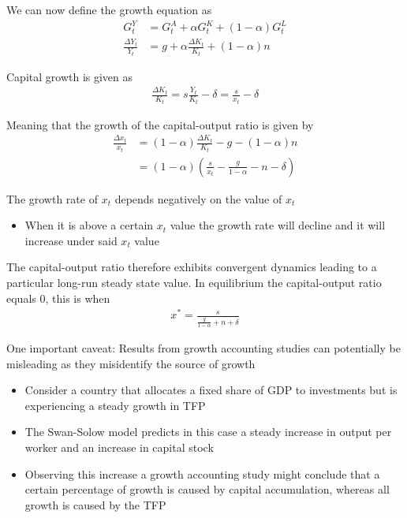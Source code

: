 \documentclass{beamer}
\begin{document}
\begin{frame}
  We can now define the growth equation as
\begin{align}
  G^Y_t &= G^A_t + \alpha G^K_t + (1-\alpha)G^L_t\\
  \frac{\Delta Y_t}{Y_t} &= g + \alpha \frac{\Delta K_t}{K_t} + (1-\alpha)n
\end{align}

Capital growth is given as
\begin{align}
  \frac{\Delta K_t}{K_t} = s \frac{Y_t}{K_t} - \delta = \frac{s}{x_t}-\delta
\end{align}

Meaning that the growth of the capital-output ratio is given by
\begin{align}
  \frac{\Delta x_t}{x_t} &= (1-\alpha) \frac{\Delta K_t}{K_t} -g - (1-\alpha)n\\
                         &= (1-\alpha) (\frac{s}{x_t} - \frac{g}{1-\alpha}-n-\delta)
\end{align}
\end{frame}

\begin{frame}
  The growth rate of $x_t$ depends negatively on the value of $x_t$
  \begin{itemize}
    \item When it is above a certain $x_t$ value the growth rate will decline and it will increase under said $x_t$ value
  \end{itemize}
  \medskip
  The capital-output ratio therefore exhibits convergent dynamics leading to a particular long-run steady state value. 
  In equilibrium the capital-output ratio equals 0, this is when
  \begin{align}
    x^* = \frac{s}{\frac{g}{1-\alpha}+n+\delta}
    \end{align}
\end{frame}

\begin{frame}
 One important caveat: Results from growth accounting studies can potentially be misleading as they misidentify the source of growth
 \begin{itemize}
   \item Consider a country that allocates a fixed share of GDP to investments but is experiencing a steady growth in TFP
   \item The Swan-Solow model predicts in this case a steady increase in output per worker and an increase in capital stock
   \item Observing this increase a growth accounting study might conclude that a certain percentage of growth is caused by capital accumulation, whereas all growth is caused by the TFP
 \end{itemize}
\end{frame}
\end{document}
